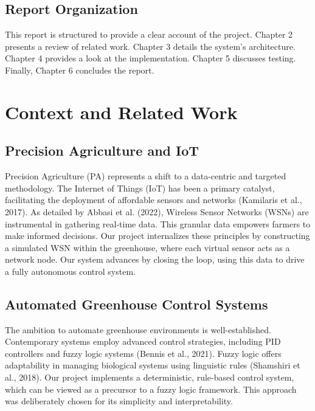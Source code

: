 \documentclass[12pt, a4paper]{report}
\begin{document}
\section{Report Organization}
This report is structured to provide a clear account of the project. Chapter 2 presents a review of related work. Chapter 3 details the system's architecture. Chapter 4 provides a look at the implementation. Chapter 5 discusses testing. Finally, Chapter 6 concludes the report.

\chapter{Context and Related Work}

\section{Precision Agriculture and IoT}
Precision Agriculture (PA) represents a shift to a data-centric and targeted methodology. The Internet of Things (IoT) has been a primary catalyst, facilitating the deployment of affordable sensors and networks (Kamilaris et al., 2017). As detailed by Abbasi et al. (2022), Wireless Sensor Networks (WSNs) are instrumental in gathering real-time data. This granular data empowers farmers to make informed decisions. Our project internalizes these principles by constructing a simulated WSN within the greenhouse, where each virtual sensor acts as a network node. Our system advances by closing the loop, using this data to drive a fully autonomous control system.

\section{Automated Greenhouse Control Systems}
The ambition to automate greenhouse environments is well-established. Contemporary systems employ advanced control strategies, including PID controllers and fuzzy logic systems (Bennis et al., 2021). Fuzzy logic offers adaptability in managing biological systems using linguistic rules (Shamshiri et al., 2018). Our project implements a deterministic, rule-based control system, which can be viewed as a precursor to a fuzzy logic framework. This approach was deliberately chosen for its simplicity and interpretability.
\end{document}
